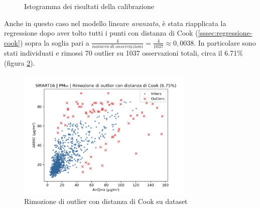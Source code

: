 \begin{figure}[H]%
    \centering
    \captionsetup{justification=centering}
    \caption{Istogramma dei risultati della calibrazione }%
    \label{fig:risultati-pm10-hist}%
\end{figure}

Anche in questo caso nel modello lineare \textit{avanzato}, è stata riapplicata la regressione dopo aver tolto tutti i punti con distanza di Cook (\ref{sssec:regressione-cook}) sopra la soglia pari a $\frac{4}{numero\ di\ osservazioni} = \frac{4}{1037} \approx 0,0038$. In particolare sono stati individuati e rimossi 70 outlier su 1037 osservazioni totali, circa il 6.71\% (figura \ref{fig:cook-pm10}).

\begin{figure}[H]
\centering
\includegraphics[width=0.75\textwidth,height=\textheight,keepaspectratio]{img/cook_pm10.png}
\caption{Rimozione di outlier con distanza di Cook su dataset }%
\label{fig:cook-pm10}%
\end{figure}

